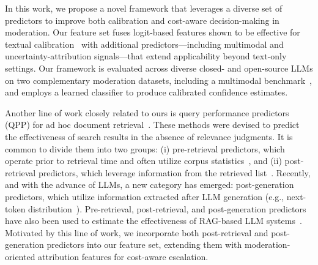 In this work, we propose a novel framework that leverages a diverse set of predictors to improve both calibration and cost-aware decision-making in moderation. Our feature set fuses logit-based features shown to be effective for textual calibration~\cite{jiang+al:21} with additional predictors—including multimodal and uncertainty-attribution signals—that extend applicability beyond text-only settings. Our framework is evaluated across diverse closed- and open-source LLMs on two complementary moderation datasets, including a multimodal benchmark~\cite{levi+al:25}, and employs a learned classifier to produce calibrated confidence estimates.

Another line of work closely related to ours is query performance predictors (QPP) for ad hoc document retrieval~\cite{carmel+Elad:10}. These methods were devised to predict the effectiveness of search results in the absence of relevance judgments. It is common to divide them into two groups: (i) pre-retrieval predictors, which operate prior to retrieval time and often utilize corpus statistics~\cite{hauff+al:08}, and (ii) post-retrieval predictors, which leverage information from the retrieved list~\cite{shtok+al:16,shtok+al:12,tao+al:14,zhou+croft:07}. 
Recently, and with the advance of LLMs, a new category has emerged: post-generation predictors, which utilize information extracted after LLM generation (e.g., next-token distribution~\cite{huly+al:25}). Pre-retrieval, post-retrieval, and post-generation predictors have also been used to estimate the effectiveness of RAG-based LLM systems~\cite{huly+al:25}. Motivated by this line of work, we incorporate both post-retrieval and post-generation predictors into our feature set, extending them with moderation-oriented attribution features for cost-aware escalation.





